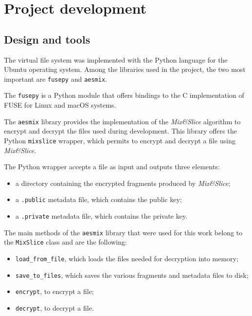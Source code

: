 \documentclass[a4paper,12pt,twoside,openright]{report}
\begin{document}
  \chapter{Project development}
  \thispagestyle{fancy}

  \section{Design and tools}

  The virtual file system was implemented with the Python language for the Ubuntu operating system.
  Among the libraries used in the project, the two most important are \texttt{fusepy} and \texttt{aesmix}.

  The \texttt{fusepy} \cite{fusepygithub} is a Python module that offers bindings to the C implementation
  of FUSE for Linux and macOS systems.

  The \texttt{aesmix} \cite{aesmixgithub} library provides the implementation of the \textit{Mix\&Slice} algorithm
  to encrypt and decrypt the files used during development.
  This library offers the Python \texttt{mixslice} wrapper, which permits to encrypt and decrypt a file using \textit{Mix\&Slice}.

  The Python wrapper accepts a file as input and outputs three elements:
  \begin{itemize}
    \item a directory containing the encrypted fragments produced by \textit{Mix\&Slice};
    \item a \texttt{.public} metadata file, which contains the public key;
    \item a \texttt{.private} metadata file, which contains the private key.
  \end{itemize}

  The main methods of the \texttt{aesmix} library that were used for this work belong to the \texttt{MixSlice} class
  and are the following:
  \begin{itemize}
    \item \texttt{load\_from\_file}, which loads the files needed for decryption into memory;
    \item \texttt{save\_to\_files}, which saves the various fragments and metadata files to disk;
    \item \texttt{encrypt}, to encrypt a file;
    \item \texttt{decrypt}, to decrypt a file.
  \end{itemize}
\end{document}
